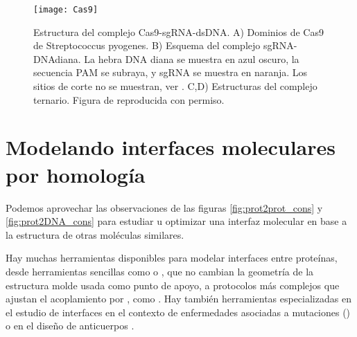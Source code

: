 \begin{figure}
\begin{center} 
\texttt{[image: Cas9]}
\caption%
{
Estructura del complejo Cas9-sgRNA-dsDNA.
A) Dominios de Cas9 de Streptococcus pyogenes. 
B) Esquema del complejo sgRNA-DNAdiana. La hebra DNA diana se muestra en azul oscuro, la secuencia PAM se subraya, y sgRNA se muestra en naranja. 
Los sitios de corte no se muestran, ver \citet{Stella2017}.
C,D) Estructuras del complejo ternario.
Figura de \cite{Jiang2016} reproducida con permiso.
}
\label{fig:Cas}
\end{center}
\end{figure}




\section{Modelando interfaces moleculares por homolog\'{i}a} \label{dockhom}

Podemos aprovechar las observaciones de las figuras \ref{fig:prot2prot_cons} y \ref{fig:prot2DNA_cons} 
para estudiar u optimizar una interfaz molecular en base a la estructura de otras mol\'{e}culas similares.

Hay muchas herramientas disponibles para modelar interfaces entre prote\'{i}nas,
desde herramientas sencillas como 
 o
,
que no cambian la geometr\'{i}a de la estructura molde usada como punto de apoyo,
a protocolos m\'{a}s complejos que ajustan el acoplamiento por ,
como .
Hay tambi\'{e}n herramientas especializadas en el estudio de interfaces en el contexto
de enfermedades asociadas a mutaciones ()
o en el dise\~{n}o de anticuerpos \citep{Lapidoth2015,Baran2017}.

